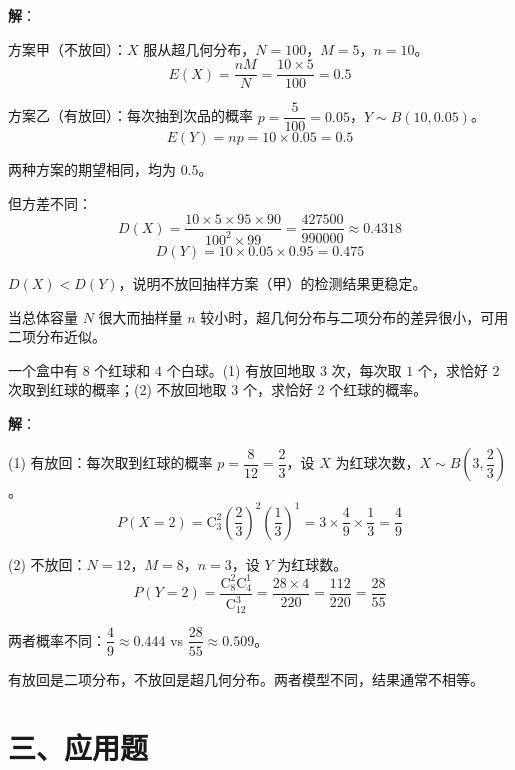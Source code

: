 \documentclass[12pt, a4paper]{ctexart}
\begin{document}
\textbf{解}：

方案甲（不放回）：$X$ 服从超几何分布，$N=100$，$M=5$，$n=10$。
\[
E(X) = \frac{nM}{N} = \frac{10 \times 5}{100} = 0.5
\]

方案乙（有放回）：每次抽到次品的概率 $p = \dfrac{5}{100} = 0.05$，$Y \sim B(10, 0.05)$。
\[
E(Y) = np = 10 \times 0.05 = 0.5
\]

两种方案的期望相同，均为 $0.5$。

但方差不同：
\[
D(X) = \frac{10 \times 5 \times 95 \times 90}{100^2 \times 99} = \frac{427500}{990000} \approx 0.4318
\]
\[
D(Y) = 10 \times 0.05 \times 0.95 = 0.475
\]

$D(X) < D(Y)$，说明不放回抽样方案（甲）的检测结果更稳定。

\begin{tipbox}[方法总结]
当总体容量 $N$ 很大而抽样量 $n$ 较小时，超几何分布与二项分布的差异很小，可用二项分布近似。
\end{tipbox}

\begin{examplebox}[【例8】二项分布与超几何分布辨析]
一个盒中有 $8$ 个红球和 $4$ 个白球。(1) 有放回地取 $3$ 次，每次取 $1$ 个，求恰好 $2$ 次取到红球的概率；(2) 不放回地取 $3$ 个，求恰好 $2$ 个红球的概率。
\end{examplebox}

\textbf{解}：

(1) 有放回：每次取到红球的概率 $p = \dfrac{8}{12} = \dfrac{2}{3}$，设 $X$ 为红球次数，$X \sim B\!\left(3, \dfrac{2}{3}\right)$。
\[
P(X=2) = \mathrm{C}_3^2 \left(\frac{2}{3}\right)^2 \left(\frac{1}{3}\right)^1 = 3 \times \frac{4}{9} \times \frac{1}{3} = \frac{4}{9}
\]

(2) 不放回：$N=12$，$M=8$，$n=3$，设 $Y$ 为红球数。
\[
P(Y=2) = \frac{\mathrm{C}_8^2 \mathrm{C}_4^1}{\mathrm{C}_{12}^3} = \frac{28 \times 4}{220} = \frac{112}{220} = \frac{28}{55}
\]

两者概率不同：$\dfrac{4}{9} \approx 0.444$ vs $\dfrac{28}{55} \approx 0.509$。

\begin{warnbox}[辨析要点]
有放回是二项分布，不放回是超几何分布。两者模型不同，结果通常不相等。
\end{warnbox}

\section*{\textcolor{apppurple}{三、应用题}}
\end{document}
